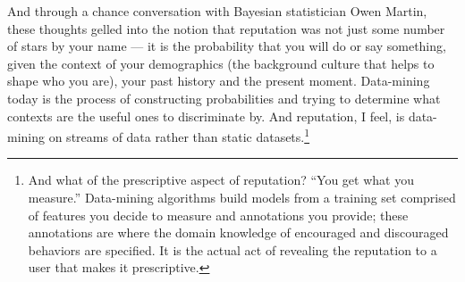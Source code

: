 And through a chance conversation with Bayesian statistician
Owen Martin, these thoughts gelled into the notion that reputation
was not just some number of stars by your name --- it is the probability
that you will do or say something, given the context of your demographics
(\ie the background culture that helps to shape who you are),
your past history and the present moment.
Data-mining today is the process of constructing probabilities and
trying to determine what contexts are the useful ones to discriminate by.
And reputation, I feel, is data-mining on streams of data
rather than static datasets.\footnote{And what of the prescriptive
aspect of reputation?  ``You get what you measure.'' Data-mining
algorithms build models from a training set comprised of
features you decide to measure and annotations you provide;
these annotations are where the domain knowledge of encouraged
and discouraged behaviors are specified.  It is the actual act
of revealing the reputation to a user that makes it prescriptive.}


